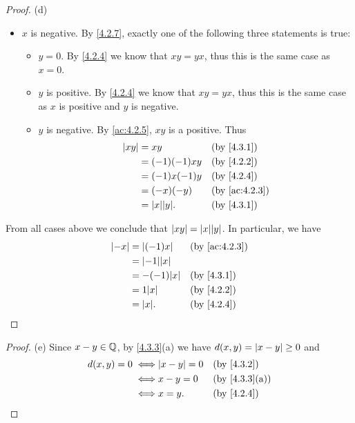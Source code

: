 \begin{proof}{(d)}
\begin{itemize}
		\item \(x\) is negative.
		      By \cref{4.2.7}, exactly one of the following three statements is true:
		      \begin{itemize}
			      \item \(y = 0\).
			            By \cref{4.2.4} we know that \(xy = yx\), thus this is the same case as \(x = 0\).
			      \item \(y\) is positive.
			            By \cref{4.2.4} we know that \(xy = yx\), thus this is the same case as \(x\) is positive and \(y\) is negative.
			      \item \(y\) is negative.
			            By \cref{ac:4.2.5}, \(xy\) is a positive.
			            Thus
			            \begin{align*}
				            \abs{xy} & = xy               &  & \by{4.3.1}    \\
				                     & = (-1)(-1)xy       &  & \by{4.2.2}    \\
				                     & = (-1)x(-1)y       &  & \by{4.2.4}    \\
				                     & = (-x)(-y)         &  & \by{ac:4.2.3} \\
				                     & = \abs{x} \abs{y}. &  & \by{4.3.1}
			            \end{align*}
		      \end{itemize}
	\end{itemize}
	From all cases above we conclude that \(\abs{xy} = \abs{x} \abs{y}\).
	In particular, we have
	\begin{align*}
		\abs{-x} & = \abs{(-1)x}      &  & \by{ac:4.2.3} \\
		         & = \abs{-1} \abs{x}                    \\
		         & = -(-1) \abs{x}    &  & \by{4.3.1}    \\
		         & = 1 \abs{x}        &  & \by{4.2.2}    \\
		         & = \abs{x}.         &  & \by{4.2.4}
	\end{align*}
\end{proof}

\begin{proof}{(e)}
	Since \(x - y \in \mathbb{Q}\), by \cref{4.3.3}(a) we have \(d(x, y) = \left\lvert x - y\right\rvert \geq 0\) and
	\begin{align*}
		d(x, y) = 0
		\iff & \abs{x - y} = 0 &  & \by{4.3.2}                  \\
		\iff & x - y = 0       &  & \text{(by \cref{4.3.3}(a))} \\
		\iff & x = y.          &  & \by{4.2.4}
	\end{align*}
\end{proof}

